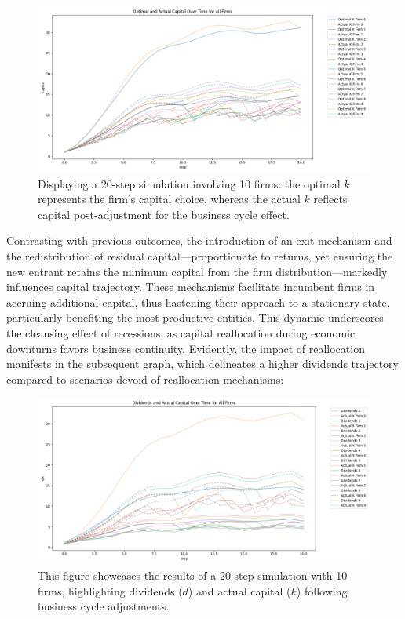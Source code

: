 \documentclass[12pt]{article}
\begin{document}
\begin{figure}[H]
    \centering
    \includegraphics[scale=0.4]{OptimalK_exit.png}
    \caption{Displaying a 20-step simulation involving 10 firms: the optimal \( k \) represents the firm's capital choice,
    whereas the actual \( k \) reflects capital post-adjustment for the business cycle
     effect.}
    \label{fig:optKE}
\end{figure}

Contrasting with previous outcomes, the introduction of an exit mechanism and the redistribution of residual
capital—proportionate to returns, yet ensuring the new entrant retains the minimum capital from the firm
distribution—markedly influences capital trajectory. These mechanisms facilitate incumbent firms in accruing additional
capital, thus hastening their approach to a stationary state, particularly benefiting the most productive entities. This
dynamic underscores the cleansing effect of recessions, as capital reallocation during economic downturns favors
business continuity. Evidently, the impact of reallocation manifests in the subsequent graph, which delineates a higher
dividends trajectory compared to scenarios devoid of reallocation mechanisms: 

\begin{figure}[H]
    \centering
    \includegraphics[scale=0.4]{div_cap_exit.png}
    \caption{This figure showcases the results of a 20-step simulation with 10 firms, highlighting dividends (\( d \))
    and actual 
    capital (\( k \)) following business cycle adjustments.}
    \label{fig:divExit}
\end{figure}
\end{document}

